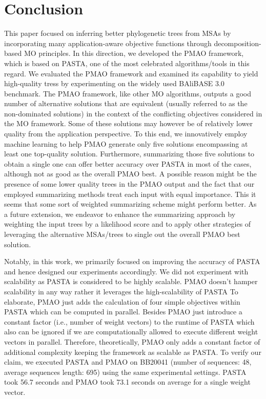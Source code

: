 \documentclass[a4paper,fleqn, review]{cas-dc}
\begin{document}
\section{Conclusion}
This paper focused on inferring better phylogenetic trees from MSAs by incorporating many application-aware objective functions through decomposition-based MO principles. In this direction, we developed the PMAO framework, which is based on PASTA, one of the most celebrated algorithms/tools in this regard. We evaluated the PMAO framework and examined its capability to yield high-quality tress by experimenting on the widely used BAliBASE 3.0 benchmark. The PMAO framework, like other MO algorithms, outputs a good number of alternative solutions that are equivalent (usually referred to as the non-dominated solutions) in the context of the conflicting objectives considered in the MO framework. Some of these solutions may however be of relatively lower quality from the application perspective. To this end, we innovatively employ machine learning to help PMAO generate only five solutions encompassing at least one top-quality solution. Furthermore, summarizing those five solutions to obtain a single one can offer better accuracy over PASTA in most of the cases, although not as good as the overall PMAO best. A possible reason might be the presence of some lower quality trees in the PMAO output and the fact that our employed summarizing methods treat each input with equal importance. This it seems that some sort of weighted summarizing scheme might perform better. As a future extension, we endeavor to enhance the summarizing approach by weighting the input trees by a likelihood score and to apply other strategies of leveraging the alternative MSAs/trees to single out the overall PMAO best solution.

Notably, in this work, we primarily focused on improving the accuracy of PASTA and hence designed our experiments accordingly. We did not experiment with scalability as PASTA is considered to be highly scalable. PMAO doesn’t hamper scalability in any way rather it leverages the high-scalability of PASTA To elaborate, PMAO just adds the calculation of four simple objectives within PASTA which can be computed in parallel. Besides PMAO just introduce a constant factor (i.e., number of weight vectors) to the runtime of PASTA which also can be ignored if we are computationally allowed to execute different weight vectors in parallel. Therefore, theoretically, PMAO only adds a constant factor of additional complexity keeping the framework as scalable as PASTA. To verify our claim, we executed PASTA and PMAO on BB20041 (number of sequences: 48, average sequences length: 695) using the same experimental settings. PASTA took 56.7 seconds and PMAO took 73.1 seconds on average for a single weight vector.  
\end{document}
